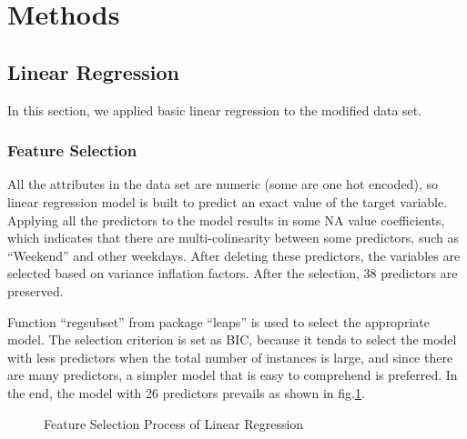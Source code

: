 \documentclass[letterpaper,12pt]{article}
\begin{document}
\section{Methods}

\subsection{Linear Regression}
In this section, we applied basic linear regression to the modified data set.
\subsubsection{Feature Selection}
All the attributes in the data set are numeric (some are one hot encoded), so linear regression model is built to predict an exact value of the target variable. Applying all the predictors to the model results in some NA value coefficients, which indicates that there are multi-colinearity between some predictors, such as “Weekend” and other weekdays. After deleting these predictors, the variables are selected based on variance inflation factors. After the selection, 38 predictors are preserved.

Function “regsubset” from package “leaps” is used to select the appropriate model. The selection criterion is set as BIC, because it tends to select the model with less predictors when the total number of instances is large, and since there are many predictors, a simpler model that is easy to comprehend is preferred. In the end, the model with 26 predictors prevails as shown in fig.\ref{fig6}.
\begin{figure}%
    \centering
    \qquad
    \caption{Feature Selection Process of Linear Regression}%
    \label{fig6}%
\end{figure}
\end{document}
